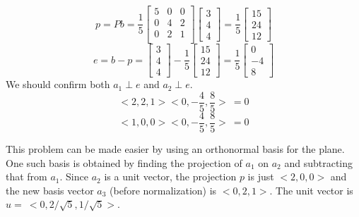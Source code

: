 \documentclass[11pt, oneside]{article}
\begin{document}
\[ p = Pb = \frac{1}{5}
\begin{bmatrix} 
  5  &  0  &  0   \\ 
  0  &  4  &  2   \\
  0  &  2  &  1   \\
\end{bmatrix}
\begin{bmatrix} 
  3   \\ 
  4   \\
  4  
\end{bmatrix}
= \frac{1}{5} 
\begin{bmatrix} 
  15   \\ 
  24   \\
  12 
\end{bmatrix}
\]
\[
e = b - p =
\begin{bmatrix} 
  3   \\ 
  4   \\
  4 
\end{bmatrix}
-
\frac{1}{5} 
\begin{bmatrix} 
  15   \\ 
  24   \\
  12
\end{bmatrix}
=
\frac{1}{5} 
\begin{bmatrix} 
  0   \\ 
  -4   \\
  8 
\end{bmatrix}
\]
We should confirm both $a_1 \perp e$ and $a_2 \perp e$.
\[ <2,2,1> <0,-\frac{4}{5},\frac{8}{5}> \ = 0 \]
\[ <1,0,0> <0,-\frac{4}{5},\frac{8}{5}> \ = 0 \]

This problem can be made easier by using an orthonormal basis for the plane.  One such basis is obtained by finding the projection of $a_1$ on $a_2$ and subtracting that from $a_1$.  Since $a_2$ is a unit vector, the projection $p$ is just $<2,0,0>$ and the new basis vector $a_3$ (before normalization) is $<0,2,1>$.  The unit vector is $u = \ <0,2/\sqrt{5},1/\sqrt{5}>$.
\end{document}
